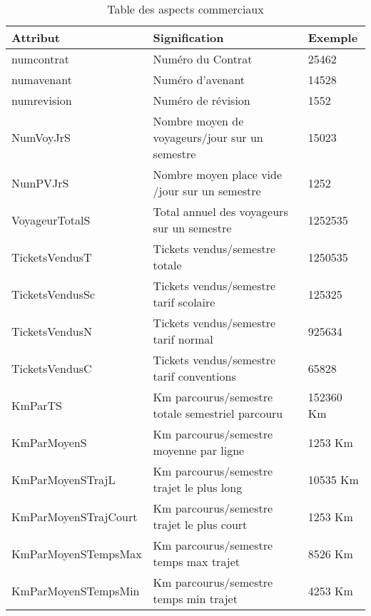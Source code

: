 	\begin{table}[H]
		\begin{center}
			\begin{tabularx}{17.5cm}{|p{4cm}|X|p{2cm}|}
				\hline
				\textbf{Attribut}    & \textbf{Signification}                           & \textbf{Exemple} \\
				\hline
				numcontrat           & Numéro du Contrat                                & 25462            \\
				\hline
				numavenant           & Numéro d'avenant                                 & 14528            \\
				\hline
				numrevision          & Numéro de révision                               & 1552             \\
				\hline
				NumVoyJrS            & Nombre moyen de voyageurs/jour  sur un semestre  & 15023            \\
				\hline
				NumPVJrS             & Nombre moyen place vide /jour  sur un semestre   & 1252             \\
				\hline
				VoyageurTotalS       & Total annuel des voyageurs  sur un semestre      & 1252535          \\
				\hline
				TicketsVendusT       & Tickets vendus/semestre totale                   & 1250535          \\
				\hline
				TicketsVendusSc      & Tickets vendus/semestre tarif scolaire           & 125325           \\
				\hline
				TicketsVendusN       & Tickets vendus/semestre tarif normal             & 925634           \\
				\hline
				TicketsVendusC       & Tickets vendus/semestre tarif conventions        & 65828            \\
				\hline
				KmParTS              & Km parcourus/semestre totale semestriel parcouru & 152360 Km        \\
				\hline
				KmParMoyenS          & Km parcourus/semestre moyenne par ligne          & 1253 Km          \\
				\hline
				KmParMoyenSTrajL     & Km parcourus/semestre trajet le plus long        & 10535 Km         \\
				\hline
				KmParMoyenSTrajCourt & Km parcourus/semestre trajet le plus court       & 1253 Km          \\
				\hline
				KmParMoyenSTempsMax  & Km parcourus/semestre temps max trajet           & 8526 Km          \\
				\hline
				KmParMoyenSTempsMin  & Km parcourus/semestre temps min trajet           & 4253 Km          \\
				\hline
			\end{tabularx}
			\caption{Table des aspects commerciaux}
		\end{center}
	\end{table}
